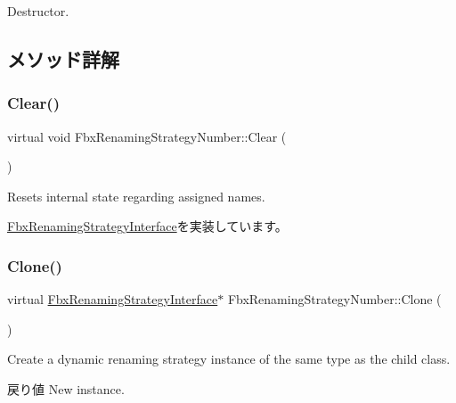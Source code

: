 Destructor. 



\subsection{メソッド詳解}
\mbox{\label{class_fbx_renaming_strategy_number_aaf762d4d2ab243e6868b5d77a3ed8040}} 
\subsubsection{\texorpdfstring{Clear()}{Clear()}}
{\footnotesize\ttfamily virtual void Fbx\+Renaming\+Strategy\+Number\+::\+Clear (\begin{DoxyParamCaption}{ }\end{DoxyParamCaption})\hspace{0.3cm}{\ttfamily [virtual]}}



Resets internal state regarding assigned names. 



\hyperlink{class_fbx_renaming_strategy_interface_a2090b5ae43936b617ec5d75015923f69}{Fbx\+Renaming\+Strategy\+Interface}を実装しています。

\mbox{\label{class_fbx_renaming_strategy_number_a05a9960c25cbbabb79ab020930fed395}} 
\subsubsection{\texorpdfstring{Clone()}{Clone()}}
{\footnotesize\ttfamily virtual \hyperlink{class_fbx_renaming_strategy_interface}{Fbx\+Renaming\+Strategy\+Interface}$\ast$ Fbx\+Renaming\+Strategy\+Number\+::\+Clone (\begin{DoxyParamCaption}{ }\end{DoxyParamCaption})\hspace{0.3cm}{\ttfamily [virtual]}}

Create a dynamic renaming strategy instance of the same type as the child class. \begin{DoxyReturn}{戻り値}
New instance. 
\end{DoxyReturn}


